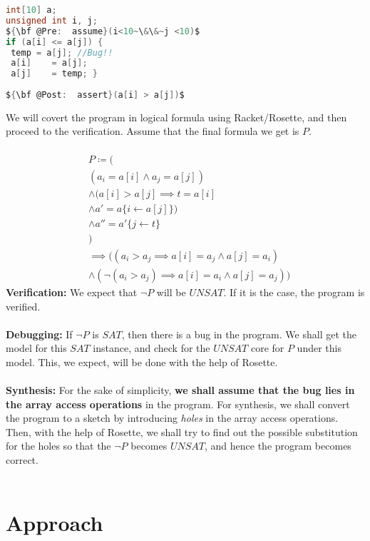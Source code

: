 \documentclass[a4paper, 12pt, notitlepage] {article}
\begin{document}
\begin{lstlisting}[language=C, mathescape=true]
int[10] a;
unsigned int i, j;
${\bf @Pre:  assume}(i<10~\&\&~j <10)$
if (a[i] <= a[j]) {
 temp = a[j]; //Bug!!
 a[i]    = a[j];
 a[j]    = temp; }
	
${\bf @Post:  assert}(a[i] > a[j])$
\end{lstlisting}
$ $\\
We will covert the program in logical formula using Racket/Rosette, and then proceed to the verification. Assume that the final formula we get is $P$.\\
\\
\begin{equation}
\begin{split}
  &P \coloneqq (\\
  &(a_i = a[i] \land a_j = a[j]) \\
&\land (a[i] > a[j] \implies t = a[i]\\
& \land a' = a\{i \leftarrow a[j]\})  \\
& \land a'' = a'\{j \leftarrow t\}\\
&) \\
&\implies ((a_i > a_j \implies a[i] = a_j \land a[j] = a_i)\\
&\land (\neg (a_i > a_j) \implies a[i] = a_i \land a[j] = a_j))
\end{split}
\end{equation}
{\bf Verification:} We expect that $\neg P$ will be $UNSAT$. If it is the case, the program is verified.
\\\\
{\bf Debugging:} If $\neg P$ is $SAT$, then there is a bug in the program. We shall get the model for this $SAT$ instance, and check for the $UNSAT$ core for $P$ under this model. This, we expect, will be done with the help of Rosette. \\
\\
{\bf Synthesis:} For the sake of simplicity, {\bf we shall assume that the bug lies in the array access operations} in the program. For synthesis, we shall convert the program to a sketch by introducing \emph{holes} in the array access operations. Then, with the help of Rosette, we shall try to find out the possible substitution for the holes so that the $\neg P$ becomes $UNSAT$, and hence the program becomes correct. \\
\\

\section {Approach}
\end{document}

